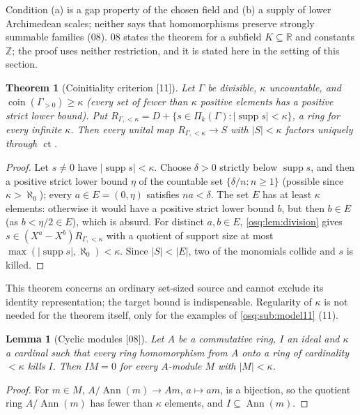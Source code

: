 \documentclass[11pt,letterpaper]{article}
\numberwithin{equation}{section}
\newtheorem{theorem}{Theorem}[section]
\newtheorem{lemma}[lemma]{Lemma}
\theoremstyle{definition}
\theoremstyle{remark}
\theoremstyle{plain}
\newcommand{\Z}{\mathbb Z}
\newcommand{\R}{\mathbb R}
\newcommand{\ct}{\operatorname{ct}}
\newcommand{\supp}{\operatorname{supp}}
\newcommand{\Ann}{\operatorname{Ann}}
\newcommand{\coin}{\operatorname{coin}}
\newcommand{\src}[1]{\textup{\textsf{[#1]}}}
\begin{document}
Condition (a) is a gap property of the chosen field and (b) a supply of lower Archimedean
scales; neither says that homomorphisms preserve strongly summable families (08). 08 states
the theorem for a subfield $K\subseteq\R$ and constants $\Z$; the proof uses neither
restriction, and it is stated here in the setting of this section.

\begin{theorem}[Coinitiality criterion \src{11}]\label{osq:thm:coinitial}
Let $\Gamma$ be divisible, $\kappa$ uncountable, and $\coin(\Gamma_{>0})\ge\kappa$ (every set of
fewer than $\kappa$ positive elements has a positive strict lower bound). Put
$R_{\Gamma,<\kappa}=D+\{s\in\Pi_k(\Gamma):|\supp s|<\kappa\}$, a ring for every infinite $\kappa$.
Then every unital map $R_{\Gamma,<\kappa}\to S$ with $|S|<\kappa$ factors uniquely through
$\ct$.
\end{theorem}
\begin{proof}
Let $s\ne0$ have $|\supp s|<\kappa$. Choose $\delta>0$ strictly below $\supp s$, and then a
positive strict lower bound $\eta$ of the countable set $\{\delta/n:n\ge1\}$ (possible since
$\kappa>\aleph_0$); every $a\in E=(0,\eta)$ satisfies $na<\delta$. The set $E$ has at least $\kappa$
elements: otherwise it would have a positive strict lower bound $b$, but then $b\in E$ (as
$b<\eta/2\in E$), which is absurd. For distinct $a,b\in E$, \cref{osq:lem:division} gives
$s\in(X^a-X^b)R_{\Gamma,<\kappa}$ with a quotient of support size at most
$\max(|\supp s|,\aleph_0)<\kappa$. Since $|S|<|E|$, two of the monomials collide and $s$ is killed.
\end{proof}

This theorem concerns an ordinary set-sized source and cannot exclude its identity
representation; the target bound is indispensable. Regularity of $\kappa$ is not needed for the
theorem itself, only for the examples of \cref{osq:sub:model11} (11).

\begin{lemma}[Cyclic modules \src{08}]\label{osq:lem:cyclic}
Let $A$ be a commutative ring, $I$ an ideal and $\kappa$ a cardinal such that every ring
homomorphism from $A$ onto a ring of cardinality $<\kappa$ kills $I$. Then $IM=0$ for every
$A$-module $M$ with $|M|<\kappa$.
\end{lemma}
\begin{proof}
For $m\in M$, $A/\Ann(m)\to Am$, $a\mapsto am$, is a bijection, so the quotient ring
$A/\Ann(m)$ has fewer than $\kappa$ elements, and $I\subseteq\Ann(m)$.
\end{proof}
\end{document}
